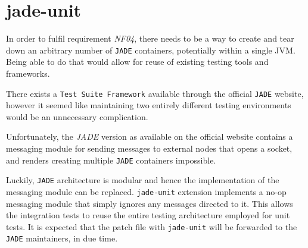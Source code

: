 \section{jade-unit}
In order to fulfil requirement \textit{NF04}, there needs to be a way to create and tear down an arbitrary number of \texttt{JADE} containers, potentially within a single JVM. Being able to do that would allow for reuse of existing testing tools and frameworks. 

There exists a \texttt{Test Suite Framework} available through the official \texttt{JADE} website, however it seemed like maintaining two entirely different testing environments would be an unnecessary complication.

Unfortunately, the \textit{JADE} version as available on the official website contains a messaging module for sending messages to external nodes that opens a socket, and renders creating multiple \texttt{JADE} containers impossible.

Luckily, \texttt{JADE} architecture is modular and hence the implementation of the messaging module can be replaced. \texttt{jade-unit} extension implements a no-op messaging module that simply ignores any messages directed to it. This allows the integration tests to reuse the entire testing architecture employed for unit tests. It is expected that the patch file with \texttt{jade-unit} will be forwarded to the \texttt{JADE} maintainers, in due time.
